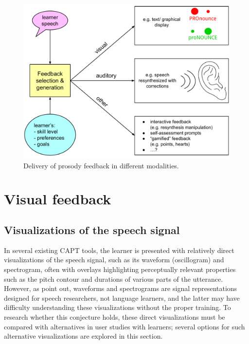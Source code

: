 	\begin{figure}[htb]
		\includegraphics[width=\textwidth]{../img/feedback}
		\caption{Delivery of prosody feedback in different modalities.}
		\label{fig:feedback}
	\end{figure}

%


\section{Visual feedback}
\label{sec:fb:visual}


	\subsection{Visualizations of the speech signal}
	\label{sec:visual:visualizations}
	In several existing CAPT tools, %
the learner is presented with relatively direct visualizations of the speech signal, such as its waveform (oscillogram) and spectrogram, often with overlays highlighting perceptually relevant properties such as the pitch contour and durations of various parts of the utterance.
	However, as \textcite{Neri2002} point out, waveforms and spectrograms are signal representations designed for speech researchers, not language learners, and the latter may have difficulty understanding these visualizations without the proper training. To research whether this conjecture holds, these direct visualizations must be compared with alternatives in user studies with learners; several options for such alternative visualizations are explored in this section.
	
